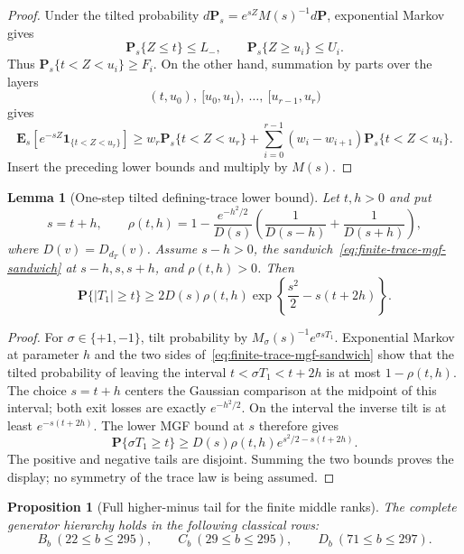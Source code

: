 \documentclass[11pt,reqno]{amsart}
\theoremstyle{plain}
\newtheorem{proposition}[theorem]{Proposition}
\newtheorem{lemma}[theorem]{Lemma}
\theoremstyle{definition}
\begin{document}
\begin{proof}
Under the tilted probability
$d\mathbf P_s=e^{sZ}M(s)^{-1}d\mathbf P$, exponential Markov gives
\[
 \mathbf P_s\{Z\leq t\}\leq L_-,
 \qquad
 \mathbf P_s\{Z\geq u_i\}\leq U_i.
\]
Thus $\mathbf P_s\{t<Z<u_i\}\geq F_i$.  On the other hand, summation by
parts over the layers
\[
 (t,u_0),\ [u_0,u_1),\ \ldots,\ [u_{r-1},u_r)
\]
gives
\[
 \mathbf E_s[e^{-sZ}\mathbf1_{\{t<Z<u_r\}}]
 \geq w_r\mathbf P_s\{t<Z<u_r\}
 +\sum_{i=0}^{r-1}(w_i-w_{i+1})
  \mathbf P_s\{t<Z<u_i\}.
\]
Insert the preceding lower bounds and multiply by $M(s)$.
\end{proof}

\begin{lemma}[One-step tilted defining-trace lower bound]
\label{lem:one-step-trace-tilt}
Let $t,h>0$ and put
\[
 s=t+h,
 \qquad
 \rho(t,h)=1-
 \frac{e^{-h^2/2}}{D(s)}
 \left(\frac1{D(s-h)}
       +\frac1{D(s+h)}\right),
\]
where $D(v)=D_{d_T}(v)$.  Assume $s-h>0$, the
sandwich~\eqref{eq:finite-trace-mgf-sandwich} at
$s-h,s,s+h$, and $\rho(t,h)>0$.  Then
\begin{equation}
\label{eq:one-step-trace-tilt}
 \mathbf P\{|T_1|\geq t\}
 \geq2D(s)\rho(t,h)
 \exp\left\{\frac{s^2}{2}-s(t+2h)\right\}.
\end{equation}
\end{lemma}

\begin{proof}
For $\sigma\in\{+1,-1\}$, tilt probability by
$M_\sigma(s)^{-1}e^{\sigma sT_1}$.  Exponential Markov at parameter $h$
and the two sides of~\eqref{eq:finite-trace-mgf-sandwich} show that the
tilted probability of leaving the interval
$t<\sigma T_1<t+2h$ is at most $1-\rho(t,h)$.  The choice
$s=t+h$ centers the Gaussian comparison at the midpoint of this interval;
both exit losses are exactly $e^{-h^2/2}$.  On the interval the inverse tilt
is at least $e^{-s(t+2h)}$.  The lower MGF bound at $s$ therefore
gives
\[
 \mathbf P\{\sigma T_1\geq t\}
 \geq D(s)\rho(t,h)e^{s^2/2-s(t+2h)}.
\]
The positive and negative tails are disjoint.  Summing the two bounds proves
the display; no symmetry of the trace law is being assumed.
\end{proof}

\begin{proposition}[Full higher-minus tail for the finite middle ranks]
\label{prop:bcd-middle-rank-full-tail}
The complete generator hierarchy holds in the following classical rows:
\[
 B_b\ (22\leq b\leq295),\qquad
 C_b\ (29\leq b\leq295),\qquad
 D_b\ (71\leq b\leq297).
\]
\end{proposition}
\end{document}
